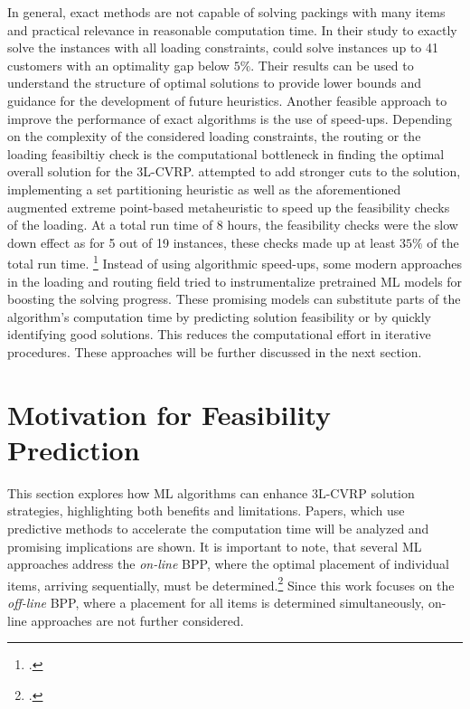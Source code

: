 In general, exact methods are not capable of solving packings with many items and practical relevance
in reasonable computation time. In their study to exactly solve the \gendreauDataSetText instances with all loading constraints,
\cite{tamke_branch-and-cut_2024} could solve instances up to 41 customers with an optimality
gap below $5 \%$. Their results can be used to understand the structure
of optimal solutions to provide lower bounds and guidance for the development of future
heuristics. Another feasible approach to improve
the performance of exact algorithms is the use of speed-ups. Depending on the complexity of
the considered loading constraints, the routing or the loading feasibiltiy check is the computational
bottleneck in finding the optimal overall solution for the \gls{3L-CVRP}. \textcite{tamke_branch-and-cut_2024} attempted to add
stronger cuts to the solution, implementing a set partitioning heuristic as well as the
aforementioned augmented extreme point-based metaheuristic to speed up the feasibility checks of the loading.
At a total run time of 8 hours, the feasibility
checks were the slow down effect as for 5 out of 19 instances, these checks made up at least $35\%$ of the total run time. \footcite[cf.][p. 2]{tamke_branch-and-cut_2024}
Instead of using algorithmic speed-ups, some modern approaches in the loading and routing field tried
to instrumentalize pretrained \gls{ML} models for boosting the solving progress.
These promising models can substitute parts of the algorithm's computation time by predicting solution
feasibility or by quickly identifying good solutions. This reduces the computational effort
in iterative procedures. These approaches will be further discussed in the next section.

\section{Motivation for Feasibility Prediction}
\label{sec:motivation_feasibility_prediction}
This section explores how \gls{ML} algorithms can enhance \gls{3L-CVRP} solution strategies,
highlighting both benefits and limitations. Papers, which use predictive methods to accelerate the computation time
will be analyzed and promising implications are shown. It is important to note, that
several \gls{ML} approaches address the \textit{on-line} \gls{BPP}, where the optimal placement
of individual items, arriving sequentially, must be determined.\footcite[cf.][p. 1]{ali_-line_2022}
Since this work focuses on the \textit{off-line} \gls{BPP}, where a placement for all items is determined
simultaneously, on-line approaches are not further considered.


